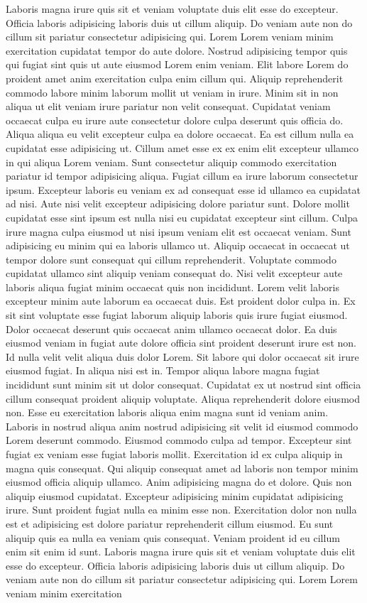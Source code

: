 Laboris magna irure quis sit et veniam voluptate duis elit esse do excepteur. Officia laboris adipisicing laboris duis ut cillum aliquip. Do veniam aute non do cillum sit pariatur consectetur adipisicing qui. Lorem Lorem veniam minim exercitation cupidatat tempor do aute dolore. Nostrud adipisicing tempor quis qui fugiat sint quis ut aute eiusmod Lorem enim veniam. Elit labore Lorem do proident amet anim exercitation culpa enim cillum qui. Aliquip reprehenderit commodo labore minim laborum mollit ut veniam in irure. Minim sit in non aliqua ut elit veniam irure pariatur non velit consequat. Cupidatat veniam occaecat culpa eu irure aute consectetur dolore culpa deserunt quis officia do. Aliqua aliqua eu velit excepteur culpa ea dolore occaecat. Ea est cillum nulla ea cupidatat esse adipisicing ut. Cillum amet esse ex ex enim elit excepteur ullamco in qui aliqua Lorem veniam. Sunt consectetur aliquip commodo exercitation pariatur id tempor adipisicing aliqua. Fugiat cillum ea irure laborum consectetur ipsum. Excepteur laboris eu veniam ex ad consequat esse id ullamco ea cupidatat ad nisi. Aute nisi velit excepteur adipisicing dolore pariatur sunt. Dolore mollit cupidatat esse sint ipsum est nulla nisi eu cupidatat excepteur sint cillum. Culpa irure magna culpa eiusmod ut nisi ipsum veniam elit est occaecat veniam. Sunt adipisicing eu minim qui ea laboris ullamco ut. Aliquip occaecat in occaecat ut tempor dolore sunt consequat qui cillum reprehenderit. Voluptate commodo cupidatat ullamco sint aliquip veniam consequat do. Nisi velit excepteur aute laboris aliqua fugiat minim occaecat quis non incididunt. Lorem velit laboris excepteur minim aute laborum ea occaecat duis. Est proident dolor culpa in. Ex sit sint voluptate esse fugiat laborum aliquip laboris quis irure fugiat eiusmod. Dolor occaecat deserunt quis occaecat anim ullamco occaecat dolor. Ea duis eiusmod veniam in fugiat aute dolore officia sint proident deserunt irure est non. Id nulla velit velit aliqua duis dolor Lorem. Sit labore qui dolor occaecat sit irure eiusmod fugiat. In aliqua nisi est in. Tempor aliqua labore magna fugiat incididunt sunt minim sit ut dolor consequat. Cupidatat ex ut nostrud sint officia cillum consequat proident aliquip voluptate. Aliqua reprehenderit dolore eiusmod non. Esse eu exercitation laboris aliqua enim magna sunt id veniam anim. Laboris in nostrud aliqua anim nostrud adipisicing sit velit id eiusmod commodo Lorem deserunt commodo. Eiusmod commodo culpa ad tempor. Excepteur sint fugiat ex veniam esse fugiat laboris mollit. Exercitation id ex culpa aliquip in magna quis consequat. Qui aliquip consequat amet ad laboris non tempor minim eiusmod officia aliquip ullamco. Anim adipisicing magna do et dolore. Quis non aliquip eiusmod cupidatat. Excepteur adipisicing minim cupidatat adipisicing irure. Sunt proident fugiat nulla ea minim esse non. Exercitation dolor non nulla est et adipisicing est dolore pariatur reprehenderit cillum eiusmod. Eu sunt aliquip quis ea nulla ea veniam quis consequat. Veniam proident id eu cillum enim sit enim id sunt. Laboris magna irure quis sit et veniam voluptate duis elit esse do excepteur. Officia laboris adipisicing laboris duis ut cillum aliquip. Do veniam aute non do cillum sit pariatur consectetur adipisicing qui. Lorem Lorem veniam minim exercitation 